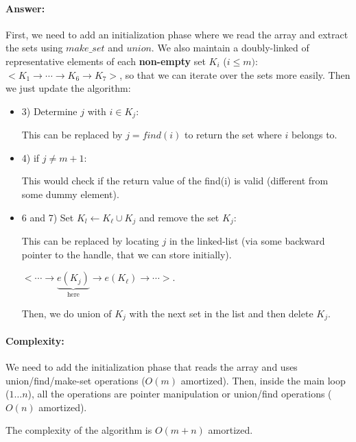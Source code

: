 \documentclass[a4paper]{article}
\begin{document}
\paragraph{Answer:} First, we need to add an initialization phase where we read the array and extract the sets using $make\_set$ and $union$. We also maintain a doubly-linked of representative elements of each \textbf{non-empty} set $K_i$ ($i \le m)$: $<K_1 \rightarrow \cdots \rightarrow K_6  \rightarrow K_7>$, so that we can iterate over the sets more easily. Then we just update the algorithm:

\begin{itemize}
\item 3) Determine $j$ with $i \in K_j$:

This can be replaced by $j = find(i)$ to return the set where $i$ belongs to.

\item 4) if $j \neq m+1$:

This would check if the return value of the find(i) is valid (different from some dummy element).

\item 6 and 7) Set $K_l \gets K_\ell \cup K_j$ and remove the set $K_j$:

This can be replaced by locating $j$ in the linked-list (via some backward pointer to the handle, that we can store initially).

$<\cdots \rightarrow \underbrace{e(K_j)}_\text{here} \rightarrow e(K_\ell) \rightarrow \cdots>$.

Then, we do union of $K_j$ with the next set in the list and then delete $K_j$.

\end{itemize}

\paragraph{Complexity: } We need to add the initialization phase that reads the array and uses union/find/make-set operations ($O(m)$ amortized).
Then, inside the main loop ($1 \ldots n$), all the operations are pointer manipulation or union/find operations ($O(n)$ amortized).

The complexity of the algorithm is $O(m+n)$ amortized. 
\end{document}
